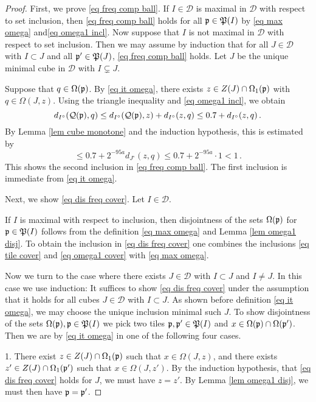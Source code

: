 \begin{proof}
    First, we prove \eqref{eq freq comp ball}. If $I \in \mathcal{D}$ is maximal in $\mathcal{D}$ with respect to set inclusion, then \eqref{eq freq comp ball} holds for all $\mathfrak p \in \mathfrak P(I)$ by \eqref{eq max omega} and\eqref{eq omega1 incl}. Now suppose that $I$ is not maximal in $\mathcal{D}$ with respect to set inclusion. Then we may assume by induction that for all $J \in \mathcal{D}$ with $I \subset J$ and all $\mathfrak p' \in \mathfrak P(J)$, \eqref{eq freq comp ball} holds. Let $J$ be the unique minimal cube in $\mathcal{D}$ with $I \subsetneq J$.

    Suppose that $q \in \Omega(\mathfrak p)$. By \eqref{eq it omega}, there exists $z \in Z(J) \cap \Omega_1(\mathfrak p)$ with $q \in \Omega(J,z)$. Using the triangle inequality and \eqref{eq omega1 incl}, we obtain
    $$
        d_{I^\circ}(\mathcal{Q}(\mathfrak p),q) \le d_{I^\circ}(\mathcal{Q}(\mathfrak p), z) + d_{I^\circ}(z, q) \le 0.7 + d_{I^\circ}(z, q)\,.
    $$
    By Lemma \ref{lem cube monotone} and the induction hypothesis, this is estimated by
    $$
        \le 0.7 + 2^{-95a} d_{J^\circ}(z,q) \le 0.7 + 2^{-95a}\cdot 1 < 1\,.
    $$
    This shows the second inclusion in \eqref{eq freq comp ball}. The first inclusion is immediate from \eqref{eq it omega}.

    Next, we show \eqref{eq dis freq cover}. Let $I \in \mathcal{D}$.

    If $I$ is maximal with respect to inclusion, then disjointness of the sets $\Omega(\mathfrak p)$ for $\mathfrak p \in \mathfrak P(I)$ follows from the definition \eqref{eq max omega} and Lemma \ref{lem omega1 disj}. To obtain the inclusion in \eqref{eq dis freq cover} one combines the inclusions \eqref{eq tile cover} and \eqref{eq omega1 cover} with  \eqref{eq max omega}.

    Now we turn to the case where there exists $J \in \mathcal{D}$ with $I \subset J$ and $I\ne J$. In this case we use induction: It suffices to show \eqref{eq dis freq cover} under the assumption that it holds for all cubes $J \in \mathcal{D}$ with $I \subset J$. As shown before definition \eqref{eq it omega}, we may choose the unique inclusion minimal such $J$. To show disjointness of the sets $\Omega(\mathfrak p), \mathfrak p \in \mathfrak P(I)$ we pick two tiles $\mathfrak p, \mathfrak p' \in \mathfrak P(I)$ and $x \in \Omega(\mathfrak p) \cap \Omega(\mathfrak p')$.
    Then we are by \eqref{eq it omega} in one of the following four cases.

    1. There exist $z \in Z(J) \cap \Omega_1(\mathfrak p)$ such that $x \in \Omega(J, z)$, and there exists $z' \in Z(J) \cap \Omega_1(\mathfrak p')$ such that $x \in \Omega(J, z')$. By the induction hypothesis, that \eqref{eq dis freq cover} holds for $J$, we must have $z = z'$. By Lemma \ref{lem omega1 disj}, we must then have $\mathfrak p = \mathfrak p'$.


\end{proof}
